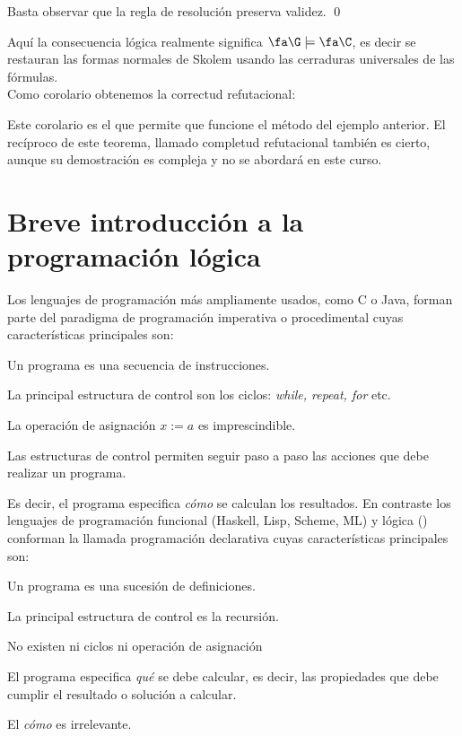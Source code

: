 \documentclass[11pt,letterpaper]{article}
\begin{document}
\proof 
Basta observar que la regla de resolución preserva validez.
\qed

\medskip

Aquí la consecuencia lógica realmente significa $\fa\G\models\fa\C$, es decir
se restauran las formas normales de Skolem usando las cerraduras universales de 
las f\'ormulas. \\
Como corolario obtenemos la correctud refutacional:

Este corolario es el que permite que funcione el método del ejemplo anterior.
El recíproco de este teorema, llamado completud refutacional también es
cierto, aunque su demostración es compleja y no se abordar\'a en este curso.



\section{Breve introducción a la programación lógica}

Los lenguajes de programación más ampliamente usados, como {\sc C} o 
{\sc Java}, forman parte del paradigma de programación imperativa o 
procedimental cuyas características principales son:
\bi
 \item Un programa es una secuencia de instrucciones.
 \item La principal estructura de control son los ciclos:
  \emph{while, repeat, for} etc.
 \item La operación de asignación $x:=a$ es imprescindible.
 \item Las estructuras de control permiten seguir paso a paso las
   acciones que debe realizar un programa.
 \item Es decir, el programa especifica \emph{cómo} se calculan los resultados.
\ei
En contraste los lenguajes de programación funcional ({\sc Haskell, Lisp, 
Scheme, ML}) y lógica ({\pl}) conforman la llamada programación 
declarativa cuyas características principales son:
\bi
 \item Un programa es una sucesión de definiciones.
 \item La principal estructura de control es la recursión.
 \item No existen ni ciclos ni operación de asignación 
 \item El programa especifica \emph{qu\'e} se debe calcular, es decir, las
  propiedades que debe cumplir el resultado o solución a calcular.
 \item El \emph{c\'omo} es irrelevante.
\ei
\end{document}
